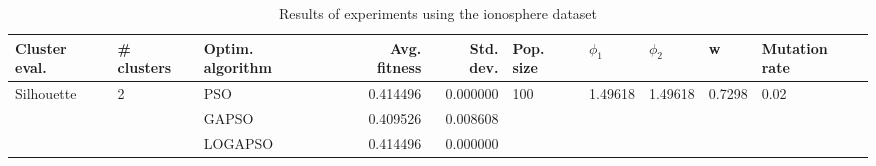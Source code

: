 \begin{table}
\centering
\caption{Results of experiments using the ionosphere dataset}
\begin{tabular}{lllrrlllll}
\toprule
              Cluster eval. &        \# clusters & Optim. algorithm &  Avg. fitness &  Std. dev. &            Pop. size &               $\phi_{1}$ &               $\phi_{2}$ &                       w &         Mutation rate \\
\midrule
\multirow{3}{*}{Silhouette} & \multirow{3}{*}{2} &              PSO &      0.414496 &   0.000000 & \multirow{3}{*}{100} & \multirow{3}{*}{1.49618} & \multirow{3}{*}{1.49618} & \multirow{3}{*}{0.7298} & \multirow{3}{*}{0.02} \\
                            &                    &            GAPSO &      0.409526 &   0.008608 &                      &                          &                          &                         &                       \\
                            &                    &          LOGAPSO &      0.414496 &   0.000000 &                      &                          &                          &                         &                       \\
\bottomrule
\end{tabular}
\end{table}
